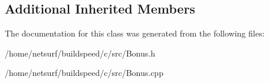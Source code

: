 \subsection*{Additional Inherited Members}


The documentation for this class was generated from the following files\+:\begin{DoxyCompactItemize}
\item 
/home/netsurf/buildspeed/c/src/Bonus.\+h\item 
/home/netsurf/buildspeed/c/src/Bonus.\+cpp\end{DoxyCompactItemize}
